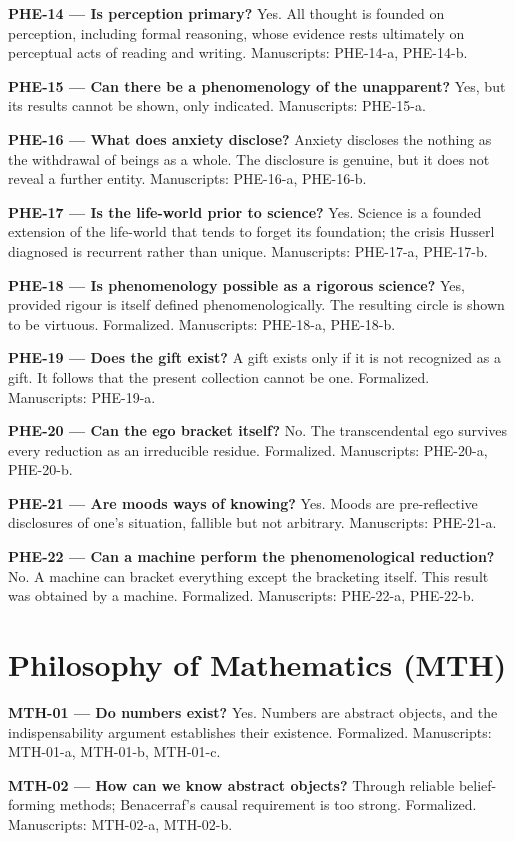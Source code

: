 \documentclass[10pt]{article}
\begin{document}
\textbf{PHE-14 --- Is perception primary?} Yes. All thought is founded on perception, including formal reasoning, whose evidence rests ultimately on perceptual acts of reading and writing. Manuscripts: PHE-14-a, PHE-14-b.

\textbf{PHE-15 --- Can there be a phenomenology of the unapparent?} Yes, but its results cannot be shown, only indicated. Manuscripts: PHE-15-a.

\textbf{PHE-16 --- What does anxiety disclose?} Anxiety discloses the nothing as the withdrawal of beings as a whole. The disclosure is genuine, but it does not reveal a further entity. Manuscripts: PHE-16-a, PHE-16-b.

\textbf{PHE-17 --- Is the life-world prior to science?} Yes. Science is a founded extension of the life-world that tends to forget its foundation; the crisis Husserl diagnosed is recurrent rather than unique. Manuscripts: PHE-17-a, PHE-17-b.

\textbf{PHE-18 --- Is phenomenology possible as a rigorous science?} Yes, provided rigour is itself defined phenomenologically. The resulting circle is shown to be virtuous. Formalized. Manuscripts: PHE-18-a, PHE-18-b.

\textbf{PHE-19 --- Does the gift exist?} A gift exists only if it is not recognized as a gift. It follows that the present collection cannot be one. Formalized. Manuscripts: PHE-19-a.

\textbf{PHE-20 --- Can the ego bracket itself?} No. The transcendental ego survives every reduction as an irreducible residue. Formalized. Manuscripts: PHE-20-a, PHE-20-b.

\textbf{PHE-21 --- Are moods ways of knowing?} Yes. Moods are pre-reflective disclosures of one's situation, fallible but not arbitrary. Manuscripts: PHE-21-a.

\textbf{PHE-22 --- Can a machine perform the phenomenological reduction?} No. A machine can bracket everything except the bracketing itself. This result was obtained by a machine. Formalized. Manuscripts: PHE-22-a, PHE-22-b.

\section*{Philosophy of Mathematics (MTH)}
\textbf{MTH-01 --- Do numbers exist?} Yes. Numbers are abstract objects, and the indispensability argument establishes their existence. Formalized. Manuscripts: MTH-01-a, MTH-01-b, MTH-01-c.

\textbf{MTH-02 --- How can we know abstract objects?} Through reliable belief-forming methods; Benacerraf's causal requirement is too strong. Formalized. Manuscripts: MTH-02-a, MTH-02-b.
\end{document}

